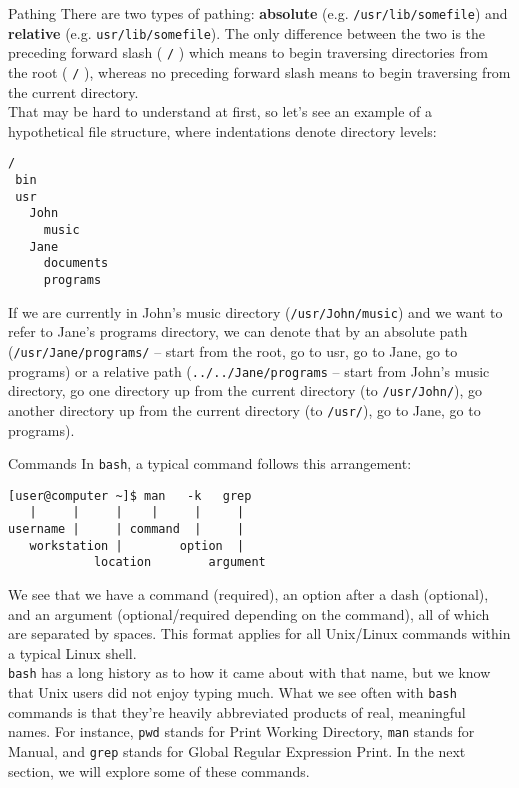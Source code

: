 \documentclass[11pt,oneside]{article}
\newenvironment{articleSectionN}[1]
{#1}
{}
\begin{document}
\begin{articleSectionN}
\begin{subsection}{Pathing}
 There are two types of pathing: \textbf{absolute} (e.g. \lstinline{/usr/lib/somefile}) and \textbf{relative} (e.g. \lstinline{usr/lib/somefile}). The only difference between the two is the preceding forward slash ( \lstinline{/} ) which means to begin traversing directories from the root ( \lstinline{/} ), whereas no preceding forward slash means to begin traversing from the current directory.\\

\noindent That may be hard to understand at first, so let's see an example of a hypothetical file structure, where indentations denote directory levels:
\begin{lstlisting}    
/
 bin
 usr
   John
     music
   Jane
     documents
     programs
\end{lstlisting}

If we are currently in John's music directory (\lstinline{/usr/John/music}) and we want to refer to Jane's programs directory, we can denote that by an absolute path (\lstinline{/usr/Jane/programs/} -- start from the root, go to usr, go to Jane, go to programs) or a relative path (\lstinline{../../Jane/programs} -- start from John's music directory, go one directory up from the current directory (to \lstinline{/usr/John/}), go another directory up from the current directory (to \lstinline{/usr/}), go to Jane, go to programs).
\end{subsection}

\begin{subsection}{Commands}
    In \lstinline{bash}, a typical command follows this arrangement:

\begin{lstlisting}    
[user@computer ~]$ man   -k   grep
   |     |     |    |     |     |
username |     | command  |     |
   workstation |        option  |
            location        argument        
\end{lstlisting}

    We see that we have a command (required), an option after a dash (optional), and an argument (optional/required depending on the command), all of which are separated by spaces. This format applies for all Unix/Linux commands within a typical Linux shell.\\
    
    \lstinline{bash} has a long history as to how it came about with that name, but we know that Unix users did not enjoy typing much. What we see often with \lstinline{bash} commands is that they're heavily abbreviated products of real, meaningful names. For instance, \lstinline{pwd} stands for Print Working Directory, \lstinline{man} stands for Manual, and \lstinline{grep} stands for Global Regular Expression Print. In the next section, we will explore some of these commands.

\end{subsection}
\end{articleSectionN}
\end{document}
